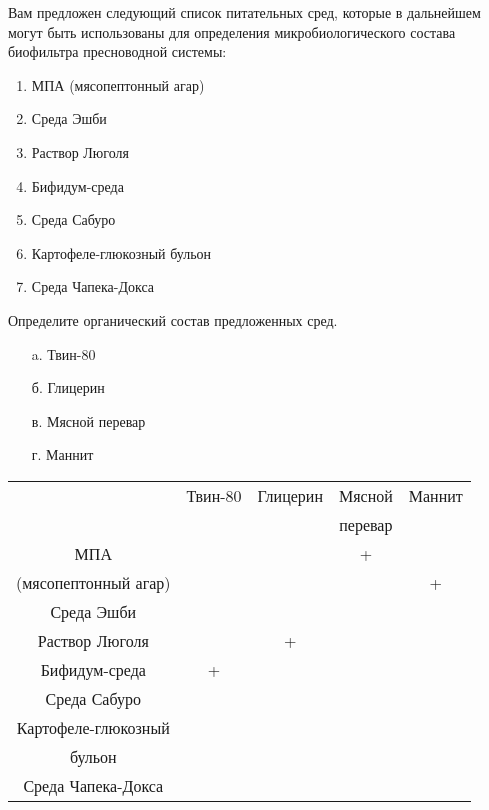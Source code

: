 
Вам предложен следующий список питательных сред, которые в дальнейшем могут быть использованы для определения микробиологического состава биофильтра пресноводной системы:

\begin{enumerate}
    \item МПА (мясопептонный агар)
    \item Среда Эшби
    \item Раствор Люголя
    \item Бифидум-среда
    \item Среда Сабуро
    \item Картофеле-глюкозный бульон
    \item Среда Чапека-Докса
\end{enumerate}

Определите органический состав предложенных сред.  

\begin{enumerate}
    \item[a.] Твин-80
    \item[б.] Глицерин
    \item[в.] Мясной перевар
    \item[г.] Маннит
\end{enumerate}

\begin{table}[!h]
    \small
    \begin{tabular}{|c|c|c|c|c|}
        \hline 
                            & Твин-80 & Глицерин & Мясной  & Маннит  \\
                            &         &          & перевар &      \\
        \hline
        МПА                 &          &     &    +     &                    \\
        (мясопептонный 
        агар)               &          &      &         & +           \\
        \hline
        Среда 
        Эшби                &         &      &         &             \\
        \hline
        Раствор 
        Люголя              &          & +     &         &           \\
        \hline
        Бифидум-среда       & +         &      &        &          \\
        \hline
        Среда Сабуро        &          &      &        &           \\
        \hline
        Картофеле-глюкозный &          &      &       &          \\
        бульон & & & & \\
        \hline
        Среда Чапека-Докса &          &      &         &             \\
        \hline
    \end{tabular}
\end{table}